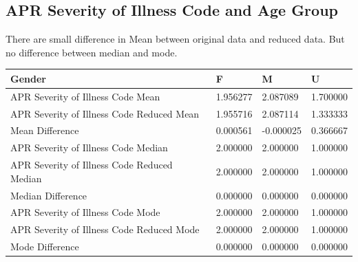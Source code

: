 \documentclass[
	letterpaper, %
]{jdf}
\begin{document}
\subsection{APR Severity of Illness Code and Age Group}
There are small difference in Mean between original data and reduced data. But no difference between median and mode. 
\begin{jdftable}
\label{table:Example}
\small %
\begin{tabular}{@{} llll}
\textbf{Gender} & \textbf{F} &\textbf{M} & \textbf{U}\\
	\toprule[0.5pt]

APR Severity of Illness Code Mean           &  1.956277 &  2.087089 &  1.700000 \\\midrule
APR Severity of Illness Code Reduced Mean   &  1.955716 &  2.087114 &  1.333333 \\\midrule
Mean Difference                             &  0.000561 & -0.000025 &  0.366667 \\\midrule
APR Severity of Illness Code Median         &  2.000000 &  2.000000 &  1.000000 \\\midrule
APR Severity of Illness Code Reduced Median &  2.000000 &  2.000000 &  1.000000 \\\midrule
Median Difference                           &  0.000000 &  0.000000 &  0.000000 \\\midrule
APR Severity of Illness Code Mode           &  2.000000 &  2.000000 &  1.000000 \\\midrule
APR Severity of Illness Code Reduced Mode   &  2.000000 &  2.000000 &  1.000000 \\\midrule
Mode Difference                             &  0.000000 &  0.000000 &  0.000000 \\
\end{tabular}
\end{jdftable}
\end{document}
